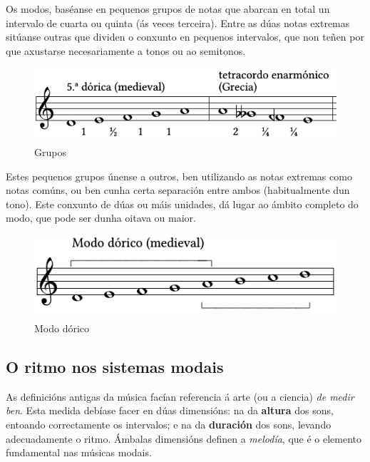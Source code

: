 \documentclass[spanish, a4paper,nobind]{templates/ociamthesis}
\begin{document}
Os modos, baséanse en pequenos grupos de notas que abarcan en total un intervalo de cuarta ou quinta (ás veces terceira). Entre as dúas notas extremas sitúanse outras que dividen o conxunto en pequenos intervalos, que non teñen por que axustarse necesariamente a tonos ou ao semitonos.

\begin{figure}
\centering
\includegraphics{figures/ud-03/grupos.png}
\caption{Grupos}
\end{figure}

Estes pequenos grupos únense a outros, ben utilizando as notas extremas como notas comúns, ou ben cunha certa separación entre ambos (habitualmente dun tono). Este conxunto de dúas ou máis unidades, dá lugar ao ámbito completo do modo, que pode ser dunha oitava ou maior.

\begin{figure}
\centering
\includegraphics{figures/ud-03/escalas-2.png}
\caption{Modo dórico}
\end{figure}

\hypertarget{o-ritmo-nos-sistemas-modais}{%
\subsection*{O ritmo nos sistemas modais}\label{o-ritmo-nos-sistemas-modais}}

As definicións antigas da música facían referencia á arte (ou a ciencia) \emph{de medir ben}. Esta medida debíase facer en dúas dimensións: na da \textbf{altura} dos sons, entoando correctamente os intervalos; e na da \textbf{duración} dos sons, levando adecuadamente o ritmo. Ámbalas dimensións definen a \emph{melodía}, que é o elemento fundamental nas músicas modais.
\end{document}
